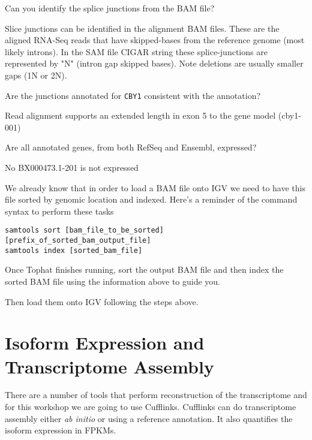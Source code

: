 \begin{questions}
Can you identify the splice junctions from the BAM file?
\begin{answer}
Slice junctions can be identified in the alignment BAM files.
These are the aligned RNA-Seq reads that have skipped-bases from the reference genome (most likely introns).
In the SAM file CIGAR string these splice-junctions are represented by "N" (intron gap skipped bases). 
Note deletions are usually smaller gaps (1N or 2N). 
\end{answer}

Are the junctions annotated for \texttt{CBY1} consistent with the annotation?
\begin{answer}
Read alignment supports an extended length in exon 5 to the gene model (cby1-001) 
\end{answer}

Are all annotated genes, from both RefSeq and Ensembl, expressed?
\begin{answer}
No BX000473.1-201 is not expressed
\end{answer}

\end{questions}

\begin{information}
We already know that in order to load a BAM file onto IGV we need to have
this file sorted by genomic location and indexed. Here's a reminder of the
command syntax to perform these tasks

\begin{lstlisting}
samtools sort [bam_file_to_be_sorted] [prefix_of_sorted_bam_output_file]
samtools index [sorted_bam_file]
\end{lstlisting}

\end{information}

\begin{steps}
Once Tophat finishes running, sort the output BAM file and then index the
sorted BAM file using the information above to guide you.

Then load them onto IGV following the steps above.
\end{steps}

\newpage
\section{Isoform Expression and Transcriptome Assembly}
There are a number of tools that perform reconstruction of the transcriptome
and for this workshop we are going to use Cufflinks. Cufflinks can do
transcriptome assembly either \textit{ab initio} or using a reference annotation. It
also quantifies the isoform expression in FPKMs.

